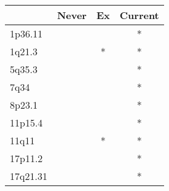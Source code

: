 \begin{tabular}{lccc}
\toprule
{} & Never & Ex & Current \\
\midrule
1p36.11  &       &    &       * \\
1q21.3   &       &  * &       * \\
5q35.3   &       &    &       * \\
7q34     &       &    &       * \\
8p23.1   &       &    &       * \\
11p15.4  &       &    &       * \\
11q11    &       &  * &       * \\
17p11.2  &       &    &       * \\
17q21.31 &       &    &       * \\
\bottomrule
\end{tabular}

